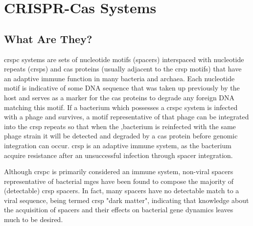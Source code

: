 \documentclass[12pt,letter]{article}
\begin{document}
\section*{CRISPR-Cas Systems}
\subsection*{What Are They?}
\ac{crspc} systems are sets of nucleotide motifs (spacers) interspaced with nucleotide repeats (\ac{crsp}s) and \ac{cas} proteins (usually adjacent to the \ac{crsp} motifs) that have an adaptive immune function in many bacteria and archaea\citep{crispgen}.
Each nucleotide motif is indicative of some DNA sequence that was taken up previously by the host and serves as a marker for the \ac{cas} proteins to degrade any foreign DNA matching this motif\citep{crispgen}.
If a bacterium which possesses a \ac{crspc} system is infected with a phage and survives, a motif representative of that phage can be integrated into the \ac{crsp} repeats so that when the ,bacterium is reinfected with the same phage strain it will be detected and degraded by a \ac{cas} protein before genomic integration can occur.
\ac{crsp} is an adaptive immune system, as the bacterium acquire resistance after an unsuccessful infection through spacer integration.\par
Although \ac{crspc} is primarily considered an immune system, non-viral spacers representative of bacterial \ac{mge}s have been found to compose the majority of (detectable) \ac{crsp} spacers\citep{nonvspacer}.
In fact, many spacers have no detectable match to a viral sequence, being termed \ac{crsp} "dark matter", indicating that knowledge about the acquisition of spacers and their effects on bacterial gene dynamics leaves much to be desired\citep{nonvspacer}.
\end{document}
